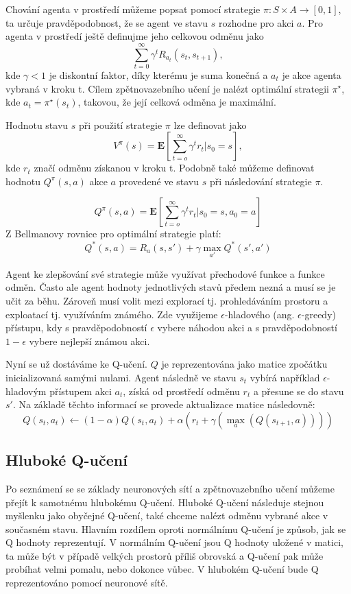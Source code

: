 Chování agenta v prostředí můžeme popsat pomocí strategie $\pi: S \times A \rightarrow [0,1]$, ta určuje pravděpodobnost, že se agent ve stavu $s$ rozhodne pro akci $a$.
Pro agenta v prostředí ještě definujme jeho celkovou odměnu jako \[\sum_{t=0}^{\infty} \gamma^tR_{a_t}(s_t,s_{t+1}),\] kde $\gamma<1$ je diskontní faktor, díky kterému je suma konečná a $a_t$ je akce agenta vybraná v kroku t.
Cílem zpětnovazebního učení je nalézt optimální strategii $\pi^\star$, kde $a_t=\pi^\star(s_t)$, takovou, že její celková odměna je maximální.

Hodnotu stavu $s$ při použití strategie $\pi$ lze definovat jako 
\newline
\[V^{\pi}(s)=\mathbf{E}[\sum_{t=o}^{\infty} \gamma^tr_t|s_0=s],\] kde $r_t$ značí odměnu získanou v kroku t.
Podobně také můžeme definovat hodnotu $Q^{\pi}(s,a)$ akce $a$ provedené ve stavu $s$ při následování strategie $\pi$.

\[Q^{\pi}(s,a)=\mathbf{E}[\sum_{t=o}^{\infty} \gamma^tr_t|s_0=s, a_0=a]\]
Z Bellmanovy rovnice pro optimální strategie platí:
\[Q^*(s,a)=R_a(s,s') + \gamma\max_{a'}Q^*(s',a')\]

Agent ke zlepšování své strategie může využívat přechodové funkce a funkce odměn. Často ale agent hodnoty jednotlivých stavů předem nezná a musí se je učit za běhu.
Zároveň musí volit mezi explorací tj. prohledáváním prostoru a exploatací tj. využíváním známého. Zde využijeme $\epsilon$-hladového (ang. $\epsilon$-greedy) přístupu, kdy s pravděpodobností $\epsilon$ vybere náhodou akci a s pravděpodobností $1-\epsilon$ vybere nejlepší známou akci.

Nyní se už dostáváme ke Q-učení. $Q$ je reprezentována jako matice zpočátku inicializovaná samými nulami. Agent následně ve stavu $s_t$ vybírá například $\epsilon$-hladovým přístupem akci $a_t$, získá od prostředí odměnu $r_t$ a přesune se do stavu $s'$.
Na základě těchto informací se provede aktualizace matice následovně:
\newline
\[Q(s_t,a_t) \leftarrow (1-\alpha)Q(s_t,a_t) + \alpha(r_t + \gamma(\max_a(Q(s_{t+1},a))))\]




\subsection{Hluboké Q-učení}
Po seznámení se se základy neuronových sítí a zpětnovazebního učení můžeme přejít k samotnému hlubokému Q-učení.
Hluboké Q-učení následuje stejnou myšlenku jako obyčejné Q-učení, také chceme nalézt odměnu vybrané akce v současném stavu.
Hlavním rozdílem oproti normálnímu Q-učení je způsob, jak se Q hodnoty reprezentují. V normálním Q-učení jsou Q hodnoty uložené v matici, ta může být v případě velkých prostorů příliš obrovská a Q-učení pak může probíhat velmi pomalu, nebo dokonce vůbec.
V hlubokém Q-učení bude Q reprezentováno pomocí neuronové sítě.

